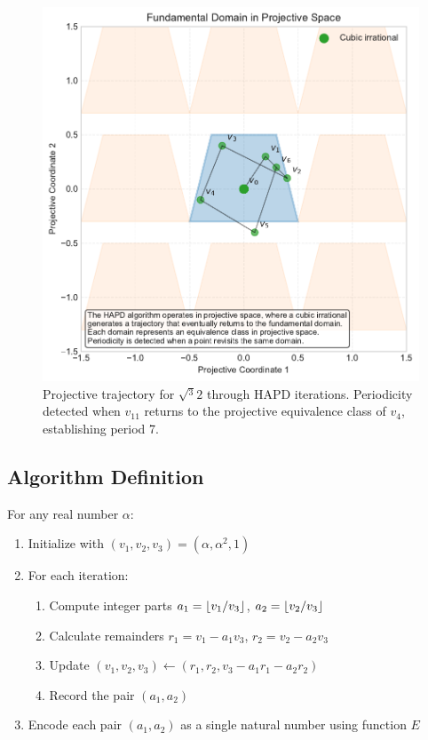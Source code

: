 \begin{figure}[htbp]
\begin{minipage}{\textwidth}
\centering
\includegraphics[width=\textwidth]{figures/projective_space_regions.pdf}
\caption{Projective trajectory for $\sqrt{^3}{2}$ through HAPD iterations. Periodicity detected when $v_{11}$ returns to the projective equivalence class of $v_4$, establishing period 7.}
\label{fig:projective_trajectory}
\end{minipage}
\end{figure}

\subsection{Algorithm Definition}

\begin{algorithm_def}\label{alg:hapd}
For any real number $\alpha$:
\begin{enumerate}
    \item Initialize with $(v_1, v_2, v_3) = (\alpha, \alpha^2, 1)$
    \item For each iteration:
    \begin{enumerate}
        \item Compute integer parts $a_1 = \lfloor v_1/v_3 \rfloor$, $a_2 = \lfloor v_2/v_3 \rfloor$
        \item Calculate remainders $r_1 = v_1 - a_1v_3$, $r_2 = v_2 - a_2v_3$
        \item Update $(v_1, v_2, v_3) \leftarrow (r_1, r_2, v_3 - a_1r_1 - a_2r_2)$
        \item Record the pair $(a_1, a_2)$
    \end{enumerate}
    \item Encode each pair $(a_1, a_2)$ as a single natural number using function $E$
\end{enumerate}
\end{algorithm_def}

